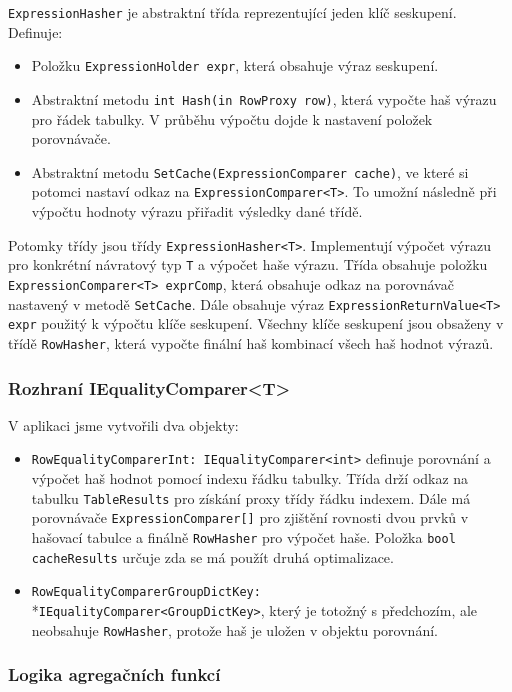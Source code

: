 \texttt{ExpressionHasher} je abstraktní třída reprezentující jeden klíč seskupení.
Definuje:
\begin{itemize}
\item Položku \texttt{ExpressionHolder expr}, která obsahuje výraz seskupení.
\item Abstraktní metodu \texttt{int Hash(in RowProxy row)}, která vypočte haš výrazu pro řádek tabulky. 
V průběhu výpočtu dojde k nastavení položek porovnávače.
\item Abstraktní metodu \texttt{SetCache(ExpressionComparer cache)}, ve které si potomci nastaví odkaz na \texttt{ExpressionComparer<T>}.
To umožní následně při výpočtu hodnoty výrazu přiřadit výsledky dané třídě.
\end{itemize}
Potomky třídy jsou třídy \texttt{ExpressionHasher<T>}.
Implementují výpočet výrazu pro konkrétní návratový typ \texttt{T} a výpočet haše výrazu.
Třída obsahuje položku \texttt{ExpressionComparer<T> exprComp}, která obsahuje odkaz na porovnávač nastavený v metodě \texttt{SetCache}. 
Dále obsahuje výraz \texttt{ExpressionReturnValue<T> expr} použitý k výpočtu klíče seskupení.
Všechny klíče seskupení jsou obsaženy v třídě \texttt{RowHasher}, která vypočte finální haš kombinací všech haš hodnot výrazů. 

\subsubsection{Rozhraní IEqualityComparer<T>}

V aplikaci jsme vytvořili dva objekty:
\begin{itemize}
\item \texttt{RowEqualityComparerInt: IEqualityComparer<int>} definuje porovnání a výpočet haš hodnot pomocí indexu řádku tabulky.
Třída drží odkaz na tabulku \texttt{TableResults} pro získání proxy třídy řádku indexem.
Dále má porovnávače \texttt{ExpressionComparer[]} pro zjištění rovnosti dvou prvků v hašovací tabulce a finálně \texttt{RowHasher} pro výpočet haše.
Položka \texttt{bool cacheResults} určuje zda se má použít druhá optimalizace.
\item \texttt{RowEqualityComparerGroupDictKey:} \\*\texttt{IEqualityComparer<GroupDictKey>}, který je totožný s předchozím, ale neobsahuje \texttt{RowHasher}, protože haš je uložen v objektu porovnání.
\end{itemize}

\subsubsection{Logika agregačních funkcí}

